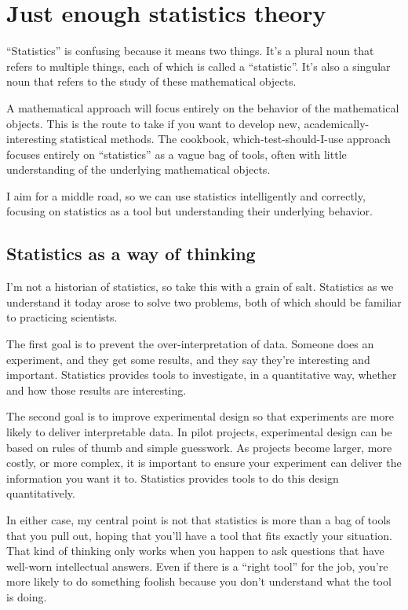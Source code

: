 
\chapter{Just enough statistics theory}

``Statistics'' is confusing because it means two things. It's a plural noun that
refers to multiple things, each of which is called a ``statistic''. It's also a
singular noun that refers to the study of these mathematical objects.

A mathematical approach will focus entirely on the behavior of the
mathematical objects. This is the route to take if you want to develop new, 
academically-interesting statistical methods. The cookbook,
which-test-should-I-use approach focuses entirely on ``statistics'' as a vague
bag of tools, often with little understanding of the underlying mathematical
objects.

I aim for a middle road, so we can use statistics intelligently and correctly,
focusing on statistics as a tool but understanding their underlying behavior.

\section{Statistics as a way of thinking}

I'm not a historian of statistics, so take this with a grain of salt.
Statistics as we understand it today arose to solve two problems, both of which should be familiar to practicing scientists.

The first goal is to prevent the over-interpretation of data. Someone does an experiment, and they get some results, and they say they're interesting and important. Statistics provides tools to investigate, in a quantitative way, whether and how those results are interesting.

The second goal is to improve experimental design so that experiments are more likely to deliver interpretable data. In pilot projects, experimental design can be based on rules of thumb and simple guesswork. As projects become larger, more costly, or more complex, it is important to ensure your experiment can deliver the information you want it to. Statistics provides tools to do this design quantitatively.

In either case, my central point is not that statistics is more than a bag of tools that you pull out, hoping that you'll have a tool that fits exactly your situation. That kind of thinking only works when you happen to ask questions that have well-worn intellectual answers. Even if there is a ``right tool'' for the job, you're more likely to do something foolish because you don't understand what the tool is doing.


